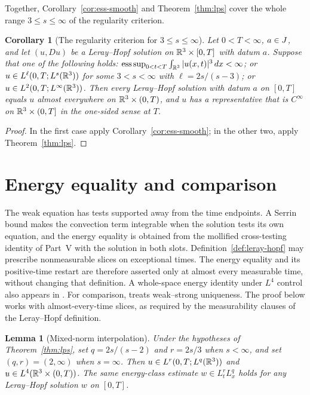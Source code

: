\documentclass[11pt,letterpaper]{article}
\numberwithin{equation}{section}
\theoremstyle{plain}
\newtheorem{lemma}[theorem]{Lemma}
\newtheorem{corollary}[theorem]{Corollary}
\theoremstyle{definition}
\theoremstyle{remark}
\begin{document}
Together, Corollary~\ref{cor:ess-smooth} and Theorem~\ref{thm:lps} cover the
whole range $3\le s\le\infty$ of the regularity criterion.

\begin{corollary}[The regularity criterion for $3\le s\le\infty$]\label{cor:serrin-criterion}
Let $0<T<\infty$, $a\in J$, and let $(u,Du)$ be a Leray--Hopf solution on
$\mathbb{R}^3\times[0,T]$ with datum $a$. Suppose that one of the following holds:
$\operatorname*{ess\,sup}_{0<t<T}\int_{\mathbb{R}^3}|u(x,t)|^3\,dx<\infty$; or
$u\in L^{\ell}(0,T;L^s(\mathbb{R}^3))$ for some $3<s<\infty$ with $\ell=2s/(s-3)$; or
$u\in L^2(0,T;L^\infty(\mathbb{R}^3))$. Then every Leray--Hopf solution with datum $a$ on
$[0,T]$ equals $u$ almost everywhere on $\mathbb{R}^3\times(0,T)$, and $u$ has a
representative that is $C^\infty$ on $\mathbb{R}^3\times(0,T]$ in the one-sided sense at $T$.
\end{corollary}

\begin{proof}
In the first case apply Corollary~\ref{cor:ess-smooth}; in the other two, apply
Theorem~\ref{thm:lps}.
\end{proof}

\section{Energy equality and comparison}\label{sec:lps-energy}

The weak equation has tests supported away from the time endpoints. A Serrin bound makes the convection term integrable when the solution tests its own equation, and the energy equality is obtained from the mollified cross-testing identity of Part~V with the solution in both slots. Definition~\ref{def:leray-hopf} may prescribe nonmeasurable slices on exceptional times. The energy equality and its positive-time restart are therefore asserted only at almost every measurable time, without changing that definition. A whole-space energy identity under $L^4$ control also appears in
\cite[Lemma~4.3, printed pp.~72--73]{Tsai2018}. For comparison,
\cite[Theorem~12.4, printed pp.~359--361]{LemarieRieusset2016}
treats weak--strong uniqueness. The proof below works with almost-every-time
slices, as required by the measurability clauses of the Leray--Hopf definition.

\begin{lemma}[Mixed-norm interpolation]\label{lem:lps-mixed-interpolation}
Under the hypotheses of Theorem~\ref{thm:lps}, set
$q=2s/(s-2)$ and $r=2s/3$ when $s<\infty$, and set $(q,r)=(2,\infty)$
when $s=\infty$. Then $u\in L^r(0,T;L^q(\mathbb{R}^3))$ and
$u\in L^4(\mathbb{R}^3\times(0,T))$. The same energy-class estimate
$w\in L^r_tL^q_x$ holds for any Leray--Hopf solution $w$ on $[0,T]$.
\end{lemma}
\end{document}
